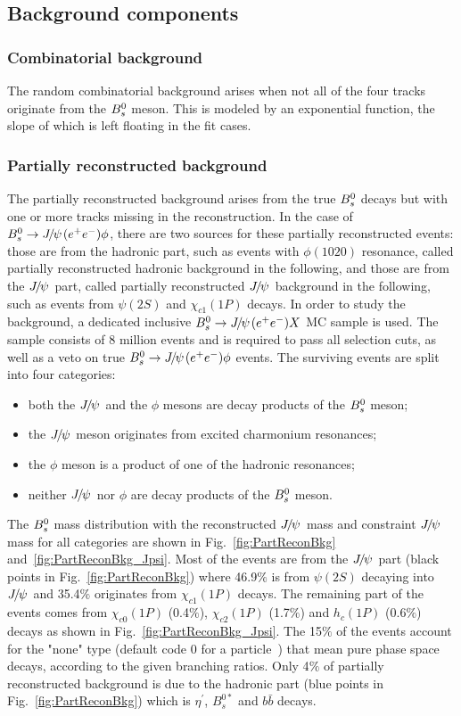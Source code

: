 \subsection{Background components}
\subsubsection{Combinatorial background}

The random combinatorial background arises when not all of the four tracks originate from the ${{B}^0_{s}}$ meson. This is modeled by an exponential function, the slope of which is left floating in the fit cases. 

\subsubsection{Partially reconstructed background}\label{subsubsec:PartRecBkg}

The partially reconstructed background arises from the true ${{B}^0_{s}}$ decays but with one or more tracks missing in the reconstruction. In the case of ${{B}^0_{s}}\rightarrow{\ensuremath{{J\mskip -3mu/\mskip -2mu\psi\mskip 2mu}}}({e^+e^-})\phi$, there are two sources for these partially reconstructed events: those are from the hadronic part, such as events with $\phi(1020)$ resonance, called partially reconstructed hadronic background in the following, and those are from the ${{J\mskip -3mu/\mskip -2mu\psi\mskip 2mu}}$ part, called partially reconstructed ${{J\mskip -3mu/\mskip -2mu\psi\mskip 2mu}}$ background in the following, such as events from $\psi(2S)$ and $\chi_{c1}(1P)$ decays. In order to study the background, a dedicated inclusive ${{B}^0_{s}}\rightarrow{\ensuremath{{J\mskip -3mu/\mskip -2mu\psi\mskip 2mu}}}({e^+e^-})X$ MC sample is used. The sample consists of 8 million events and is required to pass all selection cuts, as well as a veto on true ${{B}^0_{s}}\rightarrow{\ensuremath{{J\mskip -3mu/\mskip -2mu\psi\mskip 2mu}}}({e^+e^-})\phi$ events. The surviving events are split into four categories:
\begin{itemize}
 \item both the ${{J\mskip -3mu/\mskip -2mu\psi\mskip 2mu}}$ and the $\phi$ mesons are decay products of the ${{B}^0_{s}}$ meson;
 \item the ${{J\mskip -3mu/\mskip -2mu\psi\mskip 2mu}}$ meson originates from excited charmonium resonances;
 \item the $\phi$ meson is a product of one of the hadronic resonances;
 \item neither ${{J\mskip -3mu/\mskip -2mu\psi\mskip 2mu}}$ nor $\phi$ are decay products of the ${{B}^0_{s}}$ meson.
\end{itemize}
The ${{B}^0_{s}}$ mass distribution with the reconstructed ${{J\mskip -3mu/\mskip -2mu\psi\mskip 2mu}}$ mass and constraint ${{J\mskip -3mu/\mskip -2mu\psi\mskip 2mu}}$ mass for all categories are shown in Fig.~\ref{fig:PartReconBkg} and~\ref{fig:PartReconBkg_Jpsi}. Most of the events are from the ${{J\mskip -3mu/\mskip -2mu\psi\mskip 2mu}}$ part (black points in Fig.~\ref{fig:PartReconBkg}) where 46.9$\%$ is from $\psi(2S)$ decaying into ${{J\mskip -3mu/\mskip -2mu\psi\mskip 2mu}}$ and 35.4$\%$ originates from $\chi_{c1}(1P)$ decays. The remaining part of the events comes from $\chi_{c0}(1P)$ (0.4$\%$), $\chi_{c2}(1P)$ (1.7$\%$) and $h_{c}(1P)$ (0.6$\%$) decays as shown in Fig.~\ref{fig:PartReconBkg_Jpsi}. The 15$\%$ of the events account for the "none" type (default code 0 for a particle~\cite{Sjostrand:2006za}) that mean pure phase space decays, according to the given branching ratios. Only 4$\%$ of partially reconstructed background is due to the hadronic part (blue points in Fig.~\ref{fig:PartReconBkg}) which is $\eta^{'}$, $B^{0\ast}_{s}$ and $b\bar{b}$ decays.  

